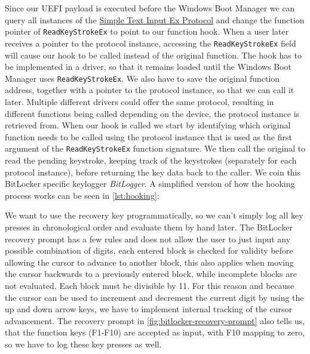 

Since our \ac{UEFI} payload is executed before the Windows Boot Manager we can query all instances of the \hyperref[lst:simple-text-input-ex-protocol]{Simple Text Input Ex Protocol} and change the function pointer of \lstinline{ReadKeyStrokeEx} to point to our function hook.
When a user later receives a pointer to the protocol instance, accessing the \lstinline{ReadKeyStrokeEx} field will cause our hook to be called instead of the original function.
The hook has to be implemented in a driver, so that it remains loaded until the Windows Boot Manager uses \lstinline{ReadKeyStrokeEx}.
We also have to save the original function address, together with a pointer to the protocol instance, so that we can call it later.
Multiple different drivers could offer the same protocol, resulting in different functions being called depending on the device, the protocol instance is retrieved from.
When our hook is called we start by identifying which original function needs to be called using the protocol instance that is used as the first argument of the \lstinline{ReadKeyStrokeEx} function signature.
We then call the original to read the pending keystroke, keeping track of the keystrokes (separately for each protocol instance), before returning the key data back to the caller.
We coin this BitLocker specific keylogger \emph{BitLogger}. A simplified version of how the hooking process works can be seen in \autoref{lst:hooking};



We want to use the recovery key programmatically, so we can't simply log all key presses in chronological order and evaluate them by hand later.
The BitLocker recovery prompt has a few rules and does not allow the user to just input any possible combination of digits, each entered block is checked for validity before allowing the cursor to advance to another block, this also applies when moving the cursor backwards to a previously entered block, while incomplete blocks are not evaluated.
Each block must be divisible by 11\cite[9]{windows-internals-6-part2}.
For this reason and because the cursor can be used to increment and decrement the current digit by using the up and down arrow keys, we have to implement internal tracking of the cursor advancement.
The recovery prompt in \autoref{fig:bitlocker-recovery-prompt} also tells us, that the function keys (F1-F10) are accepted as input, with F10 mapping to zero, so we have to log these key presses as well.


